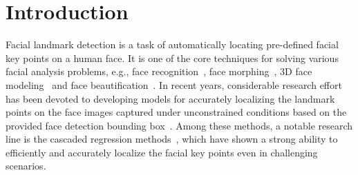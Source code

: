 \documentclass[journal]{IEEEtran}
\begin{document}
\maketitle


\IEEEdisplaynontitleabstractindextext



%
\IEEEpeerreviewmaketitle

\section{Introduction}\label{sec:introduction}
Facial landmark detection is a task of automatically locating pre-defined facial key points on a human face. It is one of the core techniques for solving various facial analysis problems, e.g., face recognition~\cite{zhao2003face}, face morphing~\cite{liu2014wow,kemelmacher2014illumination}, 3D face modeling~\cite{cao2014displaced} and face beautification~\cite{liu2014wow}. In recent years, considerable research effort has been devoted to developing models for accurately localizing the landmark points on the face images captured under unconstrained conditions based on the provided face detection bounding box~\cite{saragih2011deformable,zhu2012face,martins2013generative}. Among these methods, a notable research line is the cascaded regression methods~\cite{cao2014face,sdm,dollar2010cascaded,lee2015face}, which have shown a strong ability to efficiently and accurately localize the facial key points even in challenging scenarios.
\end{document}
